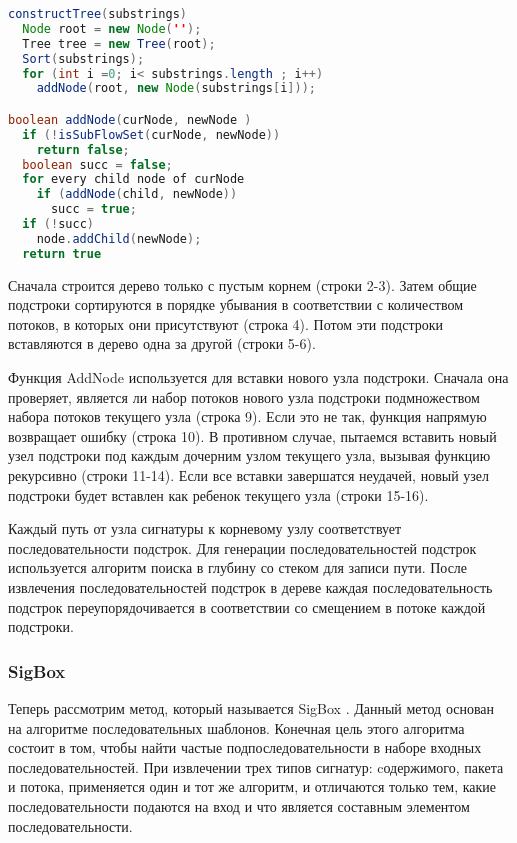 \begin{lstlisting}[language=Java, caption=Алгоритм построения дерева подстрок]
constructTree(substrings)
  Node root = new Node('');
  Tree tree = new Tree(root);
  Sort(substrings);
  for (int i =0; i< substrings.length ; i++)
    addNode(root, new Node(substrings[i]));

boolean addNode(curNode, newNode )
  if (!isSubFlowSet(curNode, newNode))
    return false;
  boolean succ = false;
  for every child node of curNode
    if (addNode(child, newNode))
      succ = true;
  if (!succ)
    node.addChild(newNode);
  return true
\end{lstlisting}

Сначала строится дерево только с пустым корнем (строки 2-3).
Затем общие подстроки сортируются в порядке убывания в соответствии с количеством потоков, в которых они присутствуют (строка 4).
Потом эти подстроки вставляются в дерево одна за другой (строки 5-6).

Функция AddNode используется для вставки нового узла подстроки.
Сначала она проверяет, является ли набор потоков нового узла подстроки подмножеством набора потоков текущего узла (строка 9).
Если это не так, функция напрямую возвращает ошибку (строка 10).
В противном случае, пытаемся вставить новый узел подстроки под каждым дочерним узлом текущего узла, вызывая функцию рекурсивно (строки 11-14).
Если все вставки завершатся неудачей, новый узел подстроки будет вставлен как ребенок текущего узла (строки 15-16).

Каждый путь от узла сигнатуры к корневому узлу соответствует последовательности подстрок.
Для генерации последовательностей подстрок используется алгоритм поиска в глубину со стеком для записи пути.
После извлечения последовательностей подстрок в дереве каждая последовательность подстрок
переупорядочивается в соответствии со смещением в потоке каждой подстроки.

\subsubsection{SigBox}

Теперь рассмотрим метод, который называется SigBox \cite{shim2017sigbox}. Данный метод основан на алгоритме последовательных шаблонов.
Конечная цель этого алгоритма состоит в том, чтобы найти частые подпоследовательности в наборе входных последовательностей.
При извлечении трех типов сигнатур: cодержимого, пакета и потока, применяется один и тот же алгоритм, и отличаются только тем, какие последовательности
подаются на вход и что является составным элементом последовательности.

